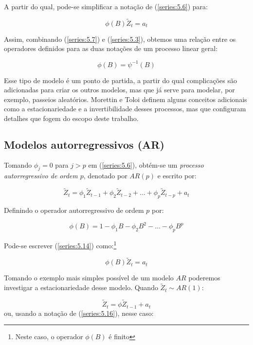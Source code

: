 A partir do qual, pode-se simplificar a notação de (\ref{series:5.6}) para:

\begin{equation}\label{series:5.7}
\phi(B)\tilde{Z}_t = a_t
\end{equation}

Assim, combinando (\ref{series:5.7}) e (\ref{series:5.3}), obtemos uma relação entre os operadores definidos para as duas notações de um processo linear geral:

\begin{equation}\label{series:5.9}
\phi(B) = \psi^{-1}(B)
\end{equation}

Esse tipo de modelo é um ponto de partida, a partir do qual complicações são adicionadas para criar os outros modelos, mas que já serve para modelar, por exemplo, passeios aleatórios. Morettin e Toloi \citep{morettin} definem alguns conceitos adicionais como a estacionariedade e a invertibilidade desses processos, mas que configuram detalhes que fogem do escopo deste trabalho.


\subsection{Modelos autorregressivos (AR)}

Tomando $\phi_j = 0$ para $j > p$ em (\ref{series:5.6}), obtém-se um \emph{processo autorregressivo de ordem $p$}, denotado por $AR(p)$ e escrito por:

\begin{equation}\label{series:5.14}
\tilde{Z}_t = \phi_1 \tilde{Z}_{t-1} + \phi_2 \tilde{Z}_{t-2} + \ldots + \phi_p \tilde{Z}_{t-p} + a_t
\end{equation}

Definindo o operador autorregressivo de ordem $p$ por:

\[
\phi(B) = 1 - \phi_1 B - \phi_2 B^2 - \ldots - \phi_p B^p
\]

Pode-se escrever (\ref{series:5.14}) como:\footnote{Neste caso, o operador $\phi(B)$ é finito}

\begin{equation}\label{series:5.16}
\phi(B)\tilde{Z}_t = a_t
\end{equation}

Tomando o exemplo mais simples possível de um modelo $AR$ poderemos investigar a estacionariedade desse modelo. Quando $\tilde{Z}_t \sim AR(1)$:

\begin{equation}\label{series:5.17}
\tilde{Z}_t = \phi \tilde{Z}_{t-1} + a_t 
\end{equation}
ou, usando a notação de (\ref{series:5.16}), nesse caso:

